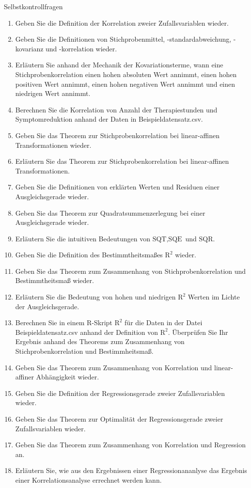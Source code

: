 \documentclass[
  8pt,
  ignorenonframetext,
]{beamer}
\providecommand{\tightlist}{%
  \setlength{\itemsep}{0pt}\setlength{\parskip}{0pt}}
\begin{document}
\begin{frame}{Selbstkontrollfragen}
\begin{enumerate}
\tightlist
\item
  Geben Sie die Definition der Korrelation zweier Zufallsvariablen
  wieder.
\item
  Geben Sie die Definitionen von Stichprobenmittel, -standardabweichung,
  -kovarianz und -korrelation wieder.
\item
  Erläutern Sie anhand der Mechanik der Kovariationsterme, wann eine
  Stichprobenkorrelation einen hohen absoluten Wert annimmt, einen hohen
  positiven Wert annimmt, einen hohen negativen Wert annimmt und einen
  niedrigen Wert annimmt.
\item
  Berechnen Sie die Korrelation von Anzahl der Therapiestunden und
  Symptomreduktion anhand der Daten in Beispieldatensatz.csv.
\item
  Geben Sie das Theorem zur Stichprobenkorrelation bei linear-affinen
  Transformationen wieder.
\item
  Erläutern Sie das Theorem zur Stichprobenkorrelation bei
  linear-affinen Transformationen.
\item
  Geben Sie die Definitionen von erklärten Werten und Residuen einer
  Ausgleichsgerade wieder.
\item
  Geben Sie das Theorem zur Quadratsummenzerlegung bei einer
  Ausgleichsgerade wieder.
\item
  Erläutern Sie die intuitiven Bedeutungen von
  \(\mbox{SQT}, \mbox{SQE}\) und \(\mbox{SQR}\).
\item
  Geben Sie die Definition des Bestimmtheitsmaßes \(\mbox{R}^2\) wieder.
\item
  Geben Sie das Theorem zum Zusammenhang von Stichprobenkorrelation und
  Bestimmtheitsmaß wieder.
\item
  Erläutern Sie die Bedeutung von hohen und niedrigen \(\mbox{R}^2\)
  Werten im Lichte der Ausgleichsgerade.
\item
  Berechnen Sie in einem R-Skript \(\mbox{R}^2\) für die Daten in der
  Datei Beispieldatensatz.csv anhand der Definition von \(\mbox{R}^2\).
  Überprüfen Sie Ihr Ergebnis anhand des Theorems zum Zusammenhang von
  Stichprobenkorrelation und Bestimmheitsmaß.
\item
  Geben Sie das Theorem zum Zusammenhang von Korrelation und
  linear-affiner Abhängigkeit wieder.
\item
  Geben Sie die Definition der Regressionsgerade zweier Zufallsvariablen
  wieder.
\item
  Geben Sie das Theorem zur Optimalität der Regressionsgerade zweier
  Zufallsvariablen wieder.
\item
  Geben Sie das Theorem zum Zusammenhang von Korrelation und Regression
  an.
\item
  Erläutern Sie, wie aus den Ergebnissen einer Regressionananlyse das
  Ergebnis einer Korrelationsanalyse errechnet werden kann.
\end{enumerate}
\end{frame}
\end{document}
